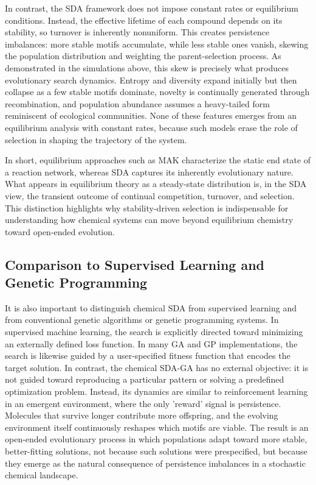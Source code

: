 \documentclass[life,article,submit,pdftex,moreauthors]{Definitions/mdpi}
\begin{document}
In contrast, the SDA framework does not impose constant rates or equilibrium conditions. Instead, the effective lifetime of each compound depends on its stability, so turnover is inherently nonuniform. This creates persistence imbalances: more stable motifs accumulate, while less stable ones vanish, skewing the population distribution and weighting the parent-selection process. As demonstrated in the simulations above, this skew is precisely what produces evolutionary search dynamics. Entropy and diversity expand initially but then collapse as a few stable motifs dominate, novelty is continually generated through recombination, and population abundance assumes a heavy-tailed form reminiscent of ecological communities. None of these features emerges from an equilibrium analysis with constant rates, because such models erase the role of selection in shaping the trajectory of the system.

In short, equilibrium approaches such as MAK characterize the static end state of a reaction network, whereas SDA captures its inherently evolutionary nature. What appears in equilibrium theory as a steady-state distribution is, in the SDA view, the transient outcome of continual competition, turnover, and selection. This distinction highlights why stability-driven selection is indispensable for understanding how chemical systems can move beyond equilibrium chemistry toward open-ended evolution.


\subsection{Comparison to Supervised Learning and Genetic Programming}  

It is also important to distinguish chemical SDA from supervised learning and from conventional genetic algorithms or genetic programming systems. In supervised machine learning, the search is explicitly directed toward minimizing an externally defined loss function. In many GA and GP implementations, the search is likewise guided by a user-specified fitness function that encodes the target solution. In contrast, the chemical SDA-GA has no external objective: it is not guided toward reproducing a particular pattern or solving a predefined optimization problem. Instead, its dynamics are similar to reinforcement learning in an emergent environment, where the only 'reward' signal is persistence. Molecules that survive longer contribute more offspring, and the evolving environment itself continuously reshapes which motifs are viable. The result is an open-ended evolutionary process in which populations adapt toward more stable, better-fitting solutions, not because such solutions were prespecified, but because they emerge as the natural consequence of persistence imbalances in a stochastic chemical landscape.
\end{document}
